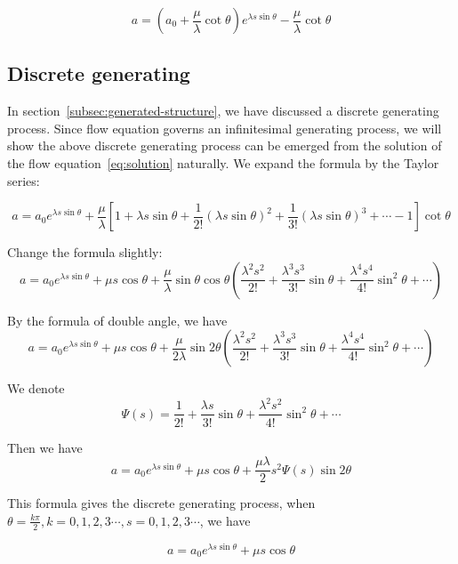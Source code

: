 \begin{equation}
   a = (a_0 + \frac{\mu}{\lambda} \cot \theta) e^{\lambda s \sin \theta} - \frac{\mu}{\lambda} \cot \theta\label{eq:solution}
\end{equation}

\subsection{Discrete generating}\label{subsec:discrete-generating}

In section~\ref{subsec:generated-structure}, we have discussed a discrete generating process.
Since flow equation governs an infinitesimal generating process,
we will show the above discrete generating process can be emerged from the solution of the flow equation~\eqref{eq:solution} naturally.
We expand the formula by the Taylor series:

\[
    a =  a_0 e^{\lambda s \sin \theta} + \frac{\mu}{\lambda} [1 + \lambda s \sin \theta + \frac{1}{2!} (\lambda s \sin \theta)^2  + \frac{1}{3!} (\lambda s \sin \theta)^3 + \cdots - 1] \cot \theta
\]

Change the formula slightly:
\[
    a = a_0 e^{\lambda s \sin \theta} + \mu s \cos \theta + \frac{\mu}{\lambda} \sin \theta \cos \theta (\frac{\lambda^2s^2}{2!} + \frac{\lambda^3s^3}{3!} \sin \theta + \frac{\lambda^4s^4}{4!} \sin^2 \theta + \cdots)
\]

By the formula of double angle, we have
\[
    a = a_0 e^{\lambda s \sin \theta} + \mu s \cos \theta + \frac{\mu}{2\lambda} \sin 2\theta (\frac{\lambda^2s^2}{2!} + \frac{\lambda^3s^3}{3!} \sin \theta + \frac{\lambda^4s^4}{4!} \sin^2 \theta + \cdots)
\]

We denote
\begin{equation}
    \Psi(s) = \frac{1}{2!} + \frac{\lambda s}{3!} \sin \theta + \frac{\lambda^2 s^2}{4!} \sin^2 \theta + \cdots
\end{equation}

Then we have
\begin{equation}
    a = a_0 e^{\lambda s \sin \theta} + \mu s \cos \theta + \frac{\mu\lambda}{2} s^2 \Psi(s) \sin 2\theta
\end{equation}

This formula gives the discrete generating process, when $\theta = \frac{k \pi}{2}, k = 0, 1, 2, 3\cdots, s = 0, 1, 2, 3\cdots$, we have

\begin{equation}
    a = a_0 e^{\lambda s \sin \theta} + \mu s \cos \theta
\end{equation}

